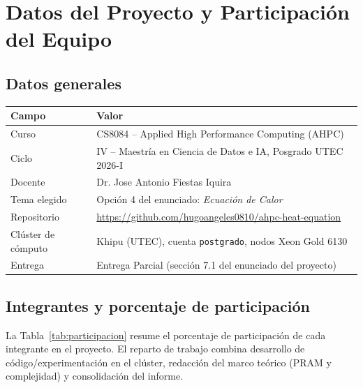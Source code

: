 \documentclass[11pt,a4paper]{article}
\renewcommand{\footrulewidth}{0.1pt}
\begin{document}

	\renewcommand{\headrulewidth}{0.6pt}
	\renewcommand{\footrulewidth}{0.6pt}

	\section{Datos del Proyecto y Participación del Equipo}
	\label{sec:participacion}

	\subsection*{Datos generales}

	\begin{center}
	\begin{tabular}{ll}
		\toprule
		\textbf{Campo} & \textbf{Valor} \\
		\midrule
		Curso & CS8084 -- Applied High Performance Computing (AHPC) \\
		Ciclo & IV -- Maestría en Ciencia de Datos e IA, Posgrado UTEC 2026-I \\
		Docente & Dr. Jose Antonio Fiestas Iquira \\
		Tema elegido & Opción 4 del enunciado: \textit{Ecuación de Calor} \\
		Repositorio & \url{https://github.com/hugoangeles0810/ahpc-heat-equation} \\
		Clúster de cómputo & Khipu (UTEC), cuenta \texttt{postgrado}, nodos Xeon Gold 6130 \\
		Entrega & Entrega Parcial (sección 7.1 del enunciado del proyecto) \\
		\bottomrule
	\end{tabular}
	\end{center}

	\subsection*{Integrantes y porcentaje de participación}

	La Tabla~\ref{tab:participacion} resume el porcentaje de participación de cada
	integrante en el proyecto. El reparto de trabajo combina desarrollo de
	código/experimentación en el clúster, redacción del marco teórico (PRAM y
	complejidad) y consolidación del informe.
\end{document}

